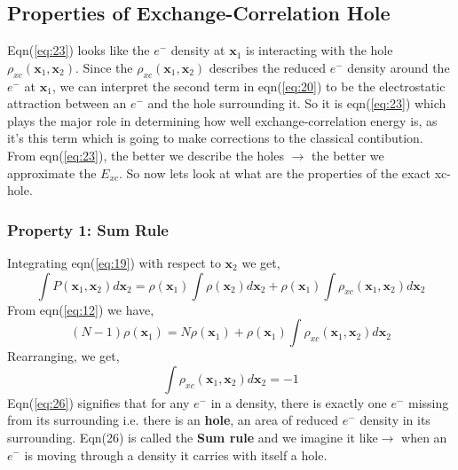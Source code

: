 \documentclass{article}
\begin{document}
 \subsection*{\Large{Properties of Exchange-Correlation Hole}}
  \begin{Large}
   \begin{flushleft}
    Eqn(\ref{eq:23}) looks like the $e^-$ density at $\textbf{x}_1$ is interacting with the hole $\rho_{xc}(\textbf{x}_1,\textbf{x}_2)$. Since the $\rho_{xc}(\textbf{x}_1,\textbf{x}_2)$ describes the reduced $e^-$ density around the $e^-$ at $\textbf{x}_1$, we can interpret the second term in eqn(\ref{eq:20}) to be the electrostatic attraction between an $e^-$ and the hole surrounding it. So it is eqn(\ref{eq:23}) which plays the major role in determining how well exchange-correlation energy is, as it's this term which is going to make corrections to the classical contibution. From eqn(\ref{eq:23}), the better we describe the holes $\rightarrow$ the better we approximate the $E_{xc}$. So now lets look at what are the properties of the exact xc-hole.
   \subsubsection*{\Large{Property 1: Sum Rule}}
    Integrating eqn(\ref{eq:19}) with respect to $\textbf{x}_2$ we get,
    \begin{equation}\label{eq:24}
    \displaystyle{\int}P(\textbf{x}_1,\textbf{x}_2)d\textbf{x}_2 = \rho(\textbf{x}_1)\displaystyle{\int}\rho(\textbf{x}_2)d\textbf{x}_2+\rho(\textbf{x}_1)\displaystyle{\int}\rho_{xc}(\textbf{x}_1,\textbf{x}_2)d\textbf{x}_2
    \end{equation}
    From eqn(\ref{eq:12}) we have,
    \begin{equation}\label{eq:25}
    (N-1)\rho(\textbf{x}_1) = N\rho(\textbf{x}_1) + \rho(\textbf{x}_1)\displaystyle{\int}\rho_{xc}(\textbf{x}_1,\textbf{x}_2)d\textbf{x}_2
    \end{equation}
    Rearranging, we get,
    \begin{equation}\label{eq:26}
    \displaystyle{\int}\rho_{xc}(\textbf{x}_1,\textbf{x}_2)d\textbf{x}_2 = -1
    \end{equation}
    Eqn(\ref{eq:26}) signifies that for any $e^-$ in a density, there is exactly one $e^-$ missing from its surrounding i.e. there is an \textbf{hole}, an area of reduced $e^-$ density in its surrounding. Eqn(26) is called the \textbf{Sum rule} and we imagine it like$\rightarrow$ when an $e^-$ is moving through a density it carries with itself a hole.
    

\end{flushleft}
\end{Large}
\end{document}
